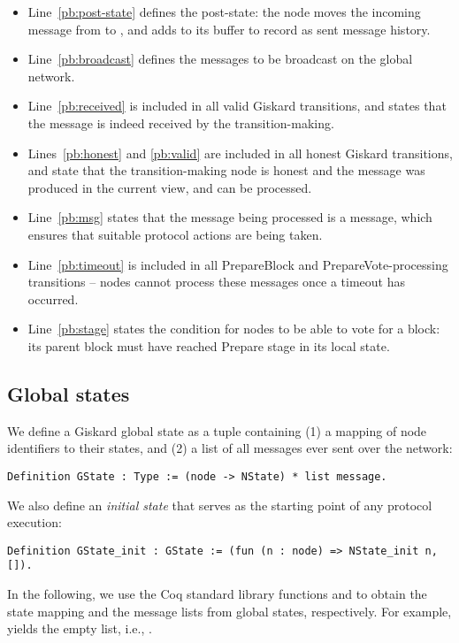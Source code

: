 \documentclass{easychair}
\begin{document}
\begin{itemize}[leftmargin=*]
\item Line~\ref{pb:post-state} defines the post-state: the node moves the incoming message from  to , and adds  to its  buffer to record as sent message history. 
\item Line~\ref{pb:broadcast} defines the messages to be broadcast on the global network. 
\item Line~\ref{pb:received} is included in all valid Giskard transitions, and states that the message is indeed received by the transition-making.
\item Lines~\ref{pb:honest} and \ref{pb:valid} are included in all honest Giskard transitions, and state that the transition-making node is honest and the message was produced in the current view, and can be processed.
\item Line~\ref{pb:msg} states that the message being processed is a  message, which ensures that suitable protocol actions are being taken. 
\item Line~\ref{pb:timeout} is included in all PrepareBlock and PrepareVote-processing transitions -- nodes cannot process these messages once a timeout has occurred. 
\item Line~\ref{pb:stage} states the condition for nodes to be able to vote for a block: its parent block must have reached Prepare stage in its local state.
\end{itemize}

\subsection{Global states}
We define a Giskard global state as a tuple containing (1) a mapping of node identifiers to their states, and (2) a list of all messages ever sent over the network:
\begin{lstlisting}[language=Coq]
Definition GState : Type := (node -> NState) * list message.
\end{lstlisting}
We also define an \emph{initial state} that serves as the starting point of any protocol execution:
\begin{lstlisting}[language=Coq]
Definition GState_init : GState := (fun (n : node) => NState_init n, []).
\end{lstlisting}
In the following, we use the Coq standard library functions  and  to obtain the state mapping and the message lists from global states, respectively. For example,  yields the empty list, i.e., \CoqIn{[]}.
\end{document}
